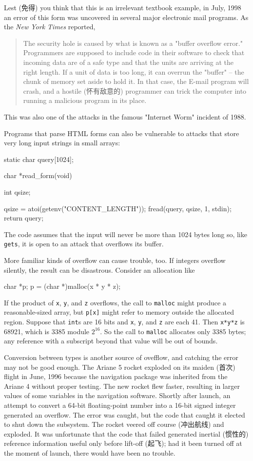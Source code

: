 Lest (免得) you think that this is an irrelevant textbook example, in July,
1998 an error of this form was uncovered in several major electronic mail
programs. As the \textit{New York Times} reported,
\begin{quotation}
    The security hole is caused by what is known as a "buffer overflow
    error." Programmers are supposed to include code in their software to
    check that incoming data are of a safe type and that the units are
    arriving at the right length. If a unit of data is too long, it can
    overrun the "buffer" -- the chunk of memory set aside to hold it. In
    that case, the E-mail program will crash, and a hostile (怀有敌意的)
    programmer can trick the computer into running a malicious program in
    its place.
\end{quotation}
This was also one of the attacks in the famous "Internet Worm" incident of
1988.

Programs that parse HTML forms can also be vulnerable to attacks that store
very long input strings in small arrays:
\begin{badcode}
    static char query[1024];

    char *read_form(void)
    {
        int qsize;

        qsize = atoi(getenv("CONTENT_LENGTH"));
        fread(query, qsize, 1, stdin);
        return query;
    }
\end{badcode}
The code assumes that the input will never be more than 1024 bytes long so,
like \verb'gets', it is open to an attack that overflows its buffer.

More familiar kinds of overflow can cause trouble, too. If integers
overflow
silently, the result can be disastrous. Consider an allocation like
\begin{badcode}
    char *p;
    p = (char *)malloc(x * y * z);
\end{badcode}

If the product of \verb'x', \verb'y', and \verb'z' overflows, the call to
\verb'malloc' might produce a reasonable-sized array, but \verb'p[x]' might
refer to memory outside the allocated region.  Suppose that \verb'int's are
16 bits and \verb'x', \verb'y', and \verb'z' are each 41. Then \verb'x*y*z'
is 68921, which is 3385 module $2^{16}$. So the call to \verb'malloc'
allocates only 3385 bytes; any reference with a subscript beyond that value
will be out of bounds.

Conversion between types is another source of ovefflow, and catching the
error may not be good enough. The Ariane 5 rocket exploded on its maiden
(首次) flight in June, 1996 because the navigation package was inherited
from the Ariane 4 without proper testing. The new rocket flew faster,
resulting in larger values of some variables in the navigation software.
Shortly after launch, an attempt to convert a 64-bit floating-point number
into a 16-bit signed integer generated an overflow. The error was caught,
but the code that caught it elected to shut down the subsystem. The rocket
veered off course (冲出航线) and exploded. It was unfortunate that the code
that failed generated inertial (惯性的) reference information useful only
before lift-off (起飞); had it been turned off at the moment of launch,
there would have been no trouble.

